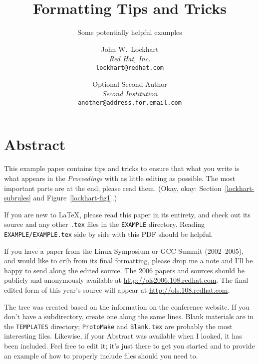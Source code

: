 \documentclass[final]{ols}
\providecommand{\XFjwlA}{lockhart}
\providecommand{\XFjwlDomA}{redhat.com}
\begin{document}
\date{}

\title{Formatting Tips and Tricks} 
\subtitle{Some potentially helpful examples}

\author{
John W.\ Lockhart \\
{\em Red Hat, Inc.}\\
{\tt\normalsize {\XFjwlA}{@}{\XFjwlDomA}}\\
\and
Optional Second Author\\
{\em Second Institution}\\
{\tt\normalsize another@address.for.email.com}\\
} %

\maketitle

\thispagestyle{empty}

\section*{Abstract}
This example paper contains tips and tricks to ensure that what you
write is what appears in the \textit{Proceedings} with as little
editing as possible.  The most important parts are at the end; please
read them.  (Okay, okay:  Section~\ref{lockhart-subrules} and
Figure~\ref{lockhart-fig1}.)

If you are new to {\LaTeX}, please read this paper in its entirety,
and check out its source and any other \texttt{.tex} files in the
\texttt{\small EXAMPLE} directory.  Reading \texttt{\small
EXAMPLE/EXAMPLE.tex} side by side with this PDF should be helpful.

If you have a paper from the Linux Symposium or GCC Summit
(2002--2005), and would like to crib from its final formatting, please
drop me a note and I'll be happy to send along the edited source.
The 2006 papers and sources should be publicly and anonymously available at
\url{http://ols2006.108.redhat.com}. 
The final edited form of this year's source will appear at
\url{http://ols.108.redhat.com}. 

The tree was created based on the information on the conference
website.  If you don't have a subdirectory, create one along the same
lines.  Blank materials are in the \texttt{\small TEMPLATES}
directory; \texttt{ProtoMake} and \texttt{Blank.tex} are probably the
most interesting files.  Likewise, if your Abstract was available when
I looked, it has been included.  Feel free to edit it; it's just there
to get you started and to provide an example of how to properly
include files should you need to.
\end{document}
